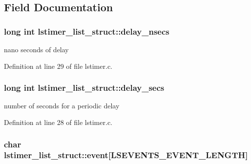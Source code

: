 \subsection{Field Documentation}
\hypertarget{structlstimer__list__struct_a45e9fc0b669a1b2831d46b465822344c}{
\subsubsection[{delay\-\_\-nsecs}]{\setlength{\rightskip}{0pt plus 5cm}long int lstimer\-\_\-list\-\_\-struct\-::delay\-\_\-nsecs}}\label{structlstimer__list__struct_a45e9fc0b669a1b2831d46b465822344c}


nano seconds of delay 



Definition at line 29 of file lstimer.\-c.

\hypertarget{structlstimer__list__struct_aa5eac664fe8159916bc3cdfbf583f818}{
\subsubsection[{delay\-\_\-secs}]{\setlength{\rightskip}{0pt plus 5cm}long int lstimer\-\_\-list\-\_\-struct\-::delay\-\_\-secs}}\label{structlstimer__list__struct_aa5eac664fe8159916bc3cdfbf583f818}


number of seconds for a periodic delay 



Definition at line 28 of file lstimer.\-c.

\hypertarget{structlstimer__list__struct_a54d564e392315b2730278bb925803184}{
\subsubsection[{event}]{\setlength{\rightskip}{0pt plus 5cm}char lstimer\-\_\-list\-\_\-struct\-::event\mbox{[}{\bf L\-S\-E\-V\-E\-N\-T\-S\-\_\-\-E\-V\-E\-N\-T\-\_\-\-L\-E\-N\-G\-T\-H}\mbox{]}}}\label{structlstimer__list__struct_a54d564e392315b2730278bb925803184}


